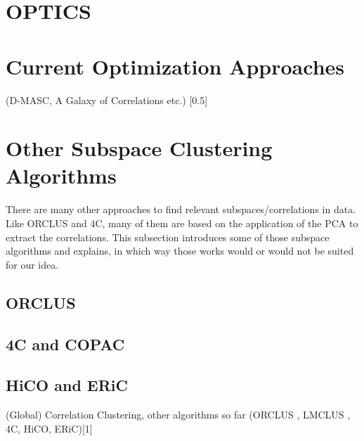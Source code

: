 \section{OPTICS}\label{sec:OPTICSintro}
\cite{opticsankerst1999optics}

\section{Current Optimization Approaches}
    (D-MASC\cite{kazempour2018d, kazempour2019galaxy}, A Galaxy of Correlations etc.) [0.5]
    
\section{Other Subspace Clustering Algorithms}
There are many other approaches to find relevant subspaces/correlations in data. Like \ac{ORCLUS} and \ac{4C}, many of them are based on the application of the \ac{PCA} to extract the correlations. This subsection introduces some of those subspace algorithms and explains, in which way those works would or would not be suited for our idea.

\subsection{ORCLUS}

\subsection{4C and COPAC}

\subsection{HiCO and ERiC}
(Global) Correlation Clustering, other algorithms so far (ORCLUS \cite{orclusaggarwal2000finding}, LMCLUS \cite{}, 4C, HiCO, ERiC)[1]